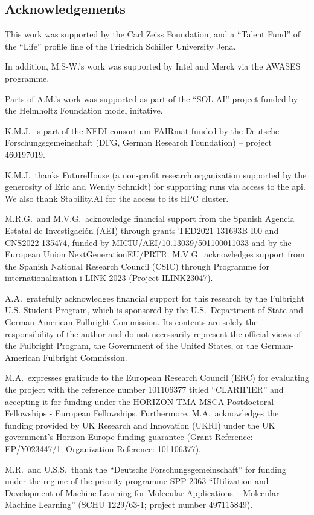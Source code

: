 \documentclass[11pt, oneside]{article}
\begin{document}
\begin{refsection}
\section*{Acknowledgements}
This work was supported by the Carl Zeiss Foundation, and a \enquote{Talent Fund} of the \enquote{Life} profile line of the Friedrich Schiller University Jena.

In addition, M.S-W.'s work was supported by Intel and Merck via the AWASES programme.

Parts of A.M.'s work was supported as part of the \enquote{SOL-AI} project funded by the Helmholtz Foundation model initative.

K.M.J.\ is part of the NFDI consortium FAIRmat funded by the Deutsche Forschungsgemeinschaft (DFG, German Research Foundation) – project 460197019.

K.M.J.\ thanks FutureHouse (a non-profit research organization supported by the generosity of Eric and Wendy Schmidt) for supporting \PaperQATwo runs via access to the \gls{api}. We also thank Stability.AI for the access to its HPC cluster.

M.R.G.\ and M.V.G.\ acknowledge financial support from the Spanish Agencia Estatal de Investigaci\'{o}n (AEI) through grants TED2021-131693B-I00 and CNS2022-135474, funded by MICIU/AEI/10.13039/501100011033 and by the European Union NextGenerationEU/PRTR. M.V.G.\ acknowledges support from the Spanish National Research Council (CSIC) through Programme for internationalization i-LINK 2023 (Project ILINK23047).

A.A.\ gratefully acknowledges financial support for this research by the Fulbright U.S. Student Program, which is sponsored by the U.S.\ Department of State and German-American Fulbright Commission. Its contents are solely the responsibility of the author and do not necessarily represent the official views of the Fulbright Program, the Government of the United States, or the German-American Fulbright Commission.

M.A.\ expresses gratitude to the European Research Council (ERC) for evaluating the project with the reference number 101106377 titled \enquote{CLARIFIER} and accepting it for funding under the HORIZON TMA MSCA Postdoctoral Fellowships - European Fellowships.
Furthermore, M.A.\ acknowledges the funding provided by UK Research and Innovation (UKRI) under the UK government’s Horizon Europe funding guarantee (Grant Reference: EP/Y023447/1; Organization Reference: 101106377).

M.R.\ and U.S.S.\ thank the \enquote{Deutsche Forschungsgemeinschaft} for funding under the regime of the priority programme SPP 2363 \enquote{Utilization and Development of Machine Learning for Molecular Applications – Molecular Machine Learning} (SCHU 1229/63-1; project number 497115849).


\end{refsection}
\end{document}
